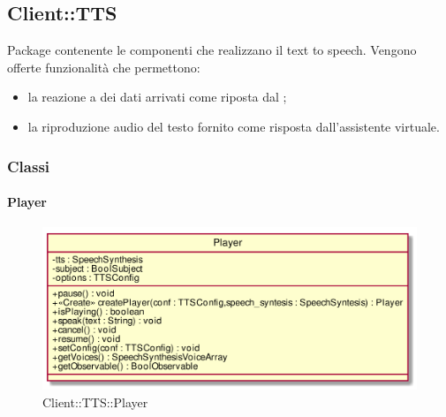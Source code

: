 \subsection{Client::TTS}
Package contenente le componenti che realizzano il text to speech.
Vengono offerte funzionalità che permettono:
\begin{itemize}
\item la reazione a dei dati arrivati come riposta dal ;
\item la riproduzione audio del testo fornito come risposta dall'assistente virtuale.
\end{itemize}

\subsubsection{Classi}
\hypertarget{Player_label}{\paragraph{Player}}
\begin{figure}[h]
	\centering
	\includegraphics[width=\textwidth,height=\textheight,keepaspectratio]{images/ClassPlayer.png}
	\caption{Client::TTS::Player}
\end{figure}
